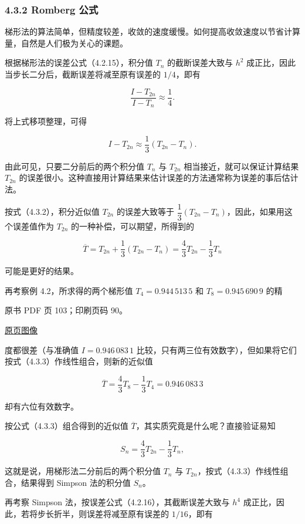 \subsubsection{4.3.2 Romberg 公式}\label{ch04a-romberg-ux516cux5f0f}

梯形法的算法简单，但精度较差，收敛的速度缓慢。如何提高收敛速度以节省计算量，自然是人们极为关心的课题。

根据梯形法的误差公式（4.2.15），积分值 \(T_n\) 的截断误差大致与 \(h^2\) 成正比，因此当步长二分后，截断误差将减至原有误差的 \(1/4\)，即有

\[
\frac{I-T_{2n}}{I-T_n}\approx\frac14.
\]

将上式移项整理，可得

\[
I-T_{2n}\approx\frac13(T_{2n}-T_n).
\tag{4.3.2}
\]

由此可见，只要二分前后的两个积分值 \(T_n\) 与 \(T_{2n}\) 相当接近，就可以保证计算结果 \(T_{2n}\) 的误差很小。这种直接用计算结果来估计误差的方法通常称为误差的事后估计法。

按式（4.3.2），积分近似值 \(T_{2n}\) 的误差大致等于 \(\dfrac13(T_{2n}-T_n)\)，因此，如果用这个误差值作为 \(T_{2n}\) 的一种补偿，可以期望，所得到的

\[
\overline T=T_{2n}+\frac13(T_{2n}-T_n)=\frac43T_{2n}-\frac13T_n
\tag{4.3.3}
\]

可能是更好的结果。

再考察例 4.2，所求得的两个梯形值 \(T_4=0.944\,513\,5\) 和 \(T_8=0.945\,690\,9\) 的精

\clearpage

原书 PDF 页 103；印刷页码 90。

\href{source-images/pdf-103.jpeg}{原页图像}

度都很差（与准确值 \(I=0.946\,083\,1\) 比较，只有两三位有效数字），但如果将它们按式（4.3.3）作线性组合，则新的近似值

\[
\overline T=\frac43T_8-\frac13T_4=0.946\,083\,3
\]

却有六位有效数字。

按公式（4.3.3）组合得到的近似值 \(\overline T\)，其实质究竟是什么呢？直接验证易知

\[
S_n=\frac43T_{2n}-\frac13T_n,
\tag{4.3.4}
\]

这就是说，用梯形法二分前后的两个积分值 \(T_n\) 与 \(T_{2n}\)，按式（4.3.3）作线性组合，结果得到 Simpson 法的积分值 \(S_n\)。

再考察 Simpson 法，按误差公式（4.2.16），其截断误差大致与 \(h^4\) 成正比，因此，若将步长折半，则误差将减至原有误差的 \(1/16\)，即有

